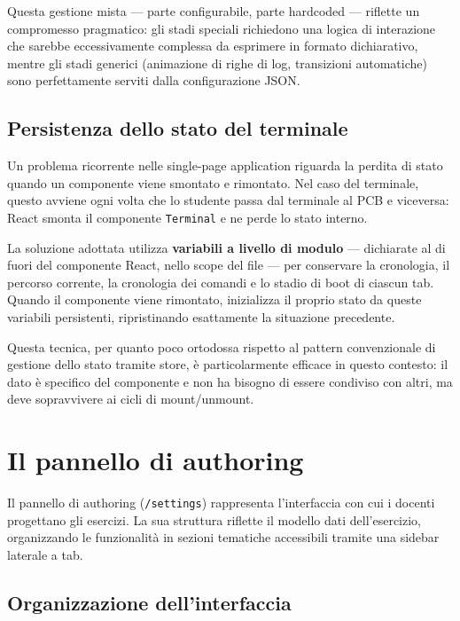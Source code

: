 Questa gestione mista --- parte configurabile, parte hardcoded --- riflette un compromesso pragmatico: gli stadi speciali richiedono una logica di interazione che sarebbe eccessivamente complessa da esprimere in formato dichiarativo, mentre gli stadi generici (animazione di righe di log, transizioni automatiche) sono perfettamente serviti dalla configurazione JSON.

\subsection{Persistenza dello stato del terminale}

Un problema ricorrente nelle single-page application riguarda la perdita di stato quando un componente viene smontato e rimontato. Nel caso del terminale, questo avviene ogni volta che lo studente passa dal terminale al PCB e viceversa: React smonta il componente \texttt{Terminal} e ne perde lo stato interno.

La soluzione adottata utilizza \textbf{variabili a livello di modulo} --- dichiarate al di fuori del componente React, nello scope del file --- per conservare la cronologia, il percorso corrente, la cronologia dei comandi e lo stadio di boot di ciascun tab. Quando il componente viene rimontato, inizializza il proprio stato da queste variabili persistenti, ripristinando esattamente la situazione precedente.

Questa tecnica, per quanto poco ortodossa rispetto al pattern convenzionale di gestione dello stato tramite store, è particolarmente efficace in questo contesto: il dato è specifico del componente e non ha bisogno di essere condiviso con altri, ma deve sopravvivere ai cicli di mount/unmount.


\section{Il pannello di authoring}
\label{sec:pannello-authoring}

Il pannello di authoring (\texttt{/settings}) rappresenta l'interfaccia con cui i docenti progettano gli esercizi. La sua struttura riflette il modello dati dell'esercizio, organizzando le funzionalità in sezioni tematiche accessibili tramite una sidebar laterale a tab.

\subsection{Organizzazione dell'interfaccia}

